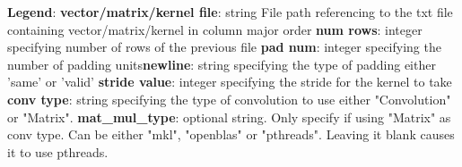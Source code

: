 \documentclass[a4paper]{article}
\begin{document}
\textbf{Legend}:\newline
\textbf{vector/matrix/kernel file}: string File path referencing to the txt file containing vector/matrix/kernel in column major order \newline
\textbf{num rows}: integer specifying number of rows of the previous file\newline
\textbf{pad num}: integer specifying the number of padding units\newline\textbf{newline}: string specifying the type of padding either 'same' or 'valid'\newline
\textbf{stride value}: integer specifying the stride for the kernel to take\newline
\textbf{conv type}: string specifying the type of convolution to use either "Convolution" or "Matrix".\newline
\textbf{mat\_mul\_type}: optional string. Only specify if using "Matrix" as conv type. Can be either "mkl", "openblas" or "pthreads". Leaving it blank causes it to use pthreads. 



\end{document}
